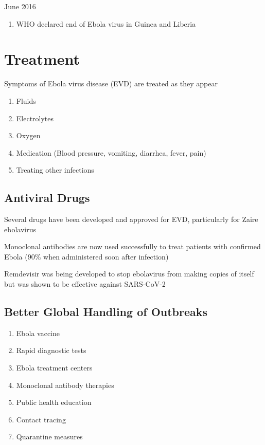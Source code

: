 \documentclass{notes}
\begin{document}
June 2016

\begin{enumerate}
    \item WHO declared end of Ebola virus in Guinea and Liberia
\end{enumerate}

\section{Treatment}

Symptoms of Ebola virus disease (EVD) are treated as they appear

\begin{enumerate}
    \item Fluids
    \item Electrolytes
    \item Oxygen
    \item Medication (Blood pressure, vomiting, diarrhea, fever, pain)
    \item Treating other infections
\end{enumerate}

\subsection{Antiviral Drugs}

Several drugs have been developed and approved for EVD, particularly for Zaire ebolavirus

\tab Monoclonal antibodies are now used successfully to treat patients with confirmed Ebola (90\% when administered soon after infection)

\tab Remdevisir was being developed to stop ebolavirus from making copies of itself but was shown to be effective against SARS-CoV-2

\subsection{Better Global Handling of Outbreaks}

\begin{enumerate}
    \item Ebola vaccine
    \item Rapid diagnostic tests
    \item Ebola treatment centers
    \item Monoclonal antibody therapies
    \item Public health education
    \item Contact tracing
    \item Quarantine measures
\end{enumerate}
\end{document}
